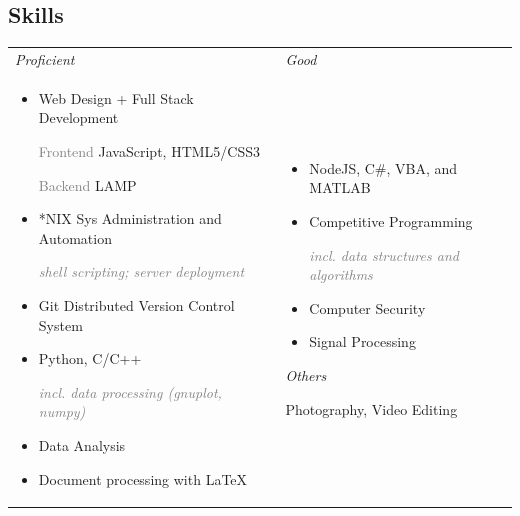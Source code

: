 \documentclass[11pt]{article}
\begin{document}
	\subsection*{Skills}
	\vspace{-\parskip}
		{
			\renewcommand{\arraystretch}{1.5}
			\setlength{\tabcolsep}{12pt}
			\begin{tabularx}{\textwidth}{@{} p{} p{} @{}}
				\textcolor{skiheader}{\textit{Proficient}} & \textcolor{skiheader}{\textit{Good}} \\
				\vspace{-1em}
				\begin{itemize}[leftmargin=3mm]
					\renewcommand\labelitemi{}
					\setlength\itemsep{0.8em}
					\item Web Design + Full Stack Development \par
						\vspace{1mm}
						\hspace{1em} \textcolor{gray}{Frontend} \hfill JavaScript, HTML\textcolor{Bittersweet}{5}/CSS\textcolor{Bittersweet}{3} \par
						\hspace{1em} \textcolor{gray}{Backend} \hfill LAMP 
					\item \**NIX Sys Administration and Automation \par
						\hfill \textcolor{gray}{\footnotesize \itshape shell scripting; server deployment}
					\item Git Distributed Version Control System
					\item Python, C/C++ \par
						\hfill \textcolor{gray}{\footnotesize \itshape incl. data processing (gnuplot, numpy)}
					\item Data Analysis
					\item Document processing with{\fontfamily{cmr} \selectfont \LaTeX}
				\end{itemize} & 
				\vspace{-1em}
				\begin{itemize}[leftmargin=3mm]
					\renewcommand\labelitemi{}
					\setlength\itemsep{0.9em}
					\item NodeJS, C\#, VBA, and MATLAB 
					\item Competitive Programming \par
						\hfill \textcolor{gray}{\footnotesize \itshape incl. data structures and algorithms}
					\item Computer Security
					\item Signal Processing
				\end{itemize}
				\vspace{1cm}
				\textcolor{skiheader}{\textit{Others}} \par
				\vspace{1mm}
				\hspace{2mm} Photography, Video Editing 


\end{tabularx}}
\end{document}
